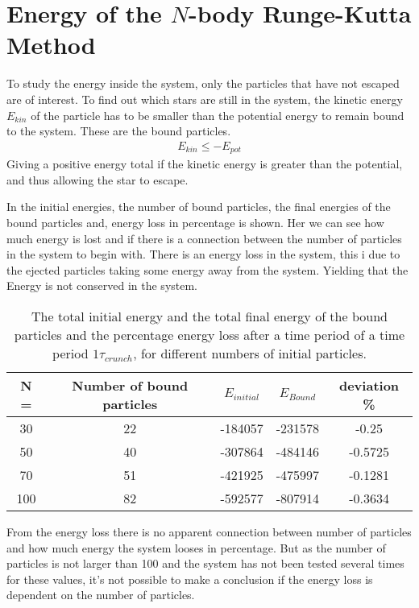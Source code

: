 \section{Energy of the $N$-body Runge-Kutta Method}
\label{sec:EnergyRK4}
To study the energy inside the system, only the particles that have not escaped are of interest. To find out which stars are still in the system, the kinetic energy $E_{kin}$ of the particle has to be smaller than the potential energy to remain bound to the system. These are the bound particles.   
\begin{align}
  E_{kin} \leqslant -E_{pot}
\end{align}
Giving a positive energy total if the kinetic energy is greater than the potential, and thus allowing the star to escape.

In  the initial energies, the number of bound particles, the final energies of the bound particles and, energy loss in percentage is shown. Her we can see how much energy is lost and if there is a connection between the number of particles in the system to begin with. There is an energy loss in the system, this i due to the ejected particles taking some energy away from the system. Yielding that the Energy is not conserved in the system. 
\begin{table}[H]
\centering
\begin{tabular}{|c|c|c|c|c|}
\hline
N = & Number of bound particles& $E_{initial}$ & $E_{Bound}$ & deviation \% \\
\hline
30  &  22 & -184057 & -231578  & -0.25 \\
50  & 40 & -307864 & -484146 & -0.5725 \\
70  & 51 & -421925 & -475997 & -0.1281 \\
100 & 82 & -592577 & -807914 & -0.3634 \\
\hline
\end{tabular}
\caption{The total initial energy and the total final energy of the bound particles and the percentage energy loss after a time period of a time period $1\tau_{crunch}$, for different numbers of initial particles. }
\label{tab:NpRK4}
\end{table}
From the energy loss there is no apparent connection between number of particles and how much energy the system looses in percentage. But as the number of particles is not larger than 100 and the system has not been tested several times for these values, it's not possible to make a conclusion if the energy loss is dependent on the number of particles. 

